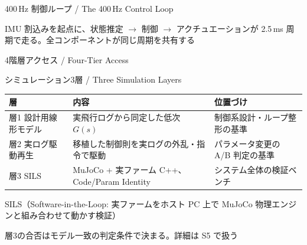 \begin{frame}{400\,Hz 制御ループ / The 400\,Hz Control Loop}
  \centering
  \vspace{-1mm}
  \resizebox{0.82\textwidth}{!}{}

  \vspace{0.3em}

  {\small IMU 割込みを起点に、状態推定 $\to$ 制御 $\to$ アクチュエーションが 2.5\,ms 周期で走る。全コンポーネントが同じ周期を共有する}
\end{frame}

\begin{frame}{4階層アクセス / Four-Tier Access}
  \centering
  \vspace{-1mm}
  \resizebox{!}{0.82\textheight}{}
\end{frame}

\begin{frame}{シミュレーション3層 / Three Simulation Layers}
  \vspace{0.3em}

  \begin{table}
    \centering\scriptsize
    \begin{tabular}{lp{45mm}p{35mm}}
      \hline
      \textbf{層} & \textbf{内容} & \textbf{位置づけ} \\
      \hline
      層1 設計用線形モデル & 実飛行ログから同定した低次 $G(s)$ & 制御系設計・ループ整形の基準 \\
      層2 実ログ駆動再生   & 移植した制御則を実ログの外乱・指令で駆動 & パラメータ変更の A/B 判定の基準 \\
      層3 SILS             & MuJoCo + 実ファーム C++、Code/Param Identity & システム全体の検証ベンチ \\
      \hline
    \end{tabular}
  \end{table}

  \vspace{0.3em}

  {\footnotesize SILS（Software-in-the-Loop: 実ファームをホスト PC 上で MuJoCo 物理エンジンと組み合わせて動かす検証）}

  \vspace{0.2em}

  {\small 層3の合否はモデル一致の判定条件で決まる。詳細は S5 で扱う}
\end{frame}

